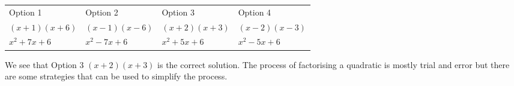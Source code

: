           \begin{table}[H]
        \begin{center}
      \label{m39394*id276265}
    \noindent
    \tabletail{%
      }
      \tablelasttail{}
      \begin{xtabular}[t]{|l|l|l|l|}\hline
        Option 1 &
        Option 2 &
        Option 3 &
        Option 4%
     \tabularnewline{}
                $\left(x+1\right)\left(x+6\right)$
               &
                $\left(x-1\right)\left(x-6\right)$
               &
                $\left(x+2\right)\left(x+3\right)$
               &
                $\left(x-2\right)\left(x-3\right)$
     \tabularnewline{}
                ${x}^{2}+7x+6$
               &
                ${x}^{2}-7x+6$
               &
                \uline{
                  ${x}^{2}+5x+6$
                }
               &
                ${x}^{2}-5x+6$
     \tabularnewline{}
    \end{xtabular}
      \end{center}
\end{table}
    \par
      \label{m39394*id276547}We see that Option 3 $(x+2)(x+3)$ is the correct solution. The process of factorising a quadratic is mostly trial and error but there are some strategies that can be used to simplify the process.\par 
      \label{m39394*uid20}



